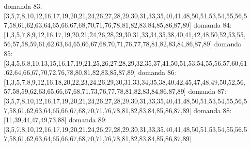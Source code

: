 domanda 83:[3,5,7,8,10,12,16,17,19,20,21,24,26,27,28,29,30,31,33,35,40,41,48,50,51,53,54,55,56,57,58,61,62,63,64,65,66,67,68,70,71,76,78,81,82,83,84,85,86,87,89]
domanda 84:[1,3,5,7,8,9,12,16,17,19,20,21,24,26,28,29,30,31,33,34,35,38,40,41,42,48,50,52,53,55,56,57,58,59,61,62,63,64,65,66,67,68,70,71,76,77,78,81,82,83,84,86,87,89]
domanda 85:[3,4,5,6,8,10,13,15,16,17,19,21,25,26,27,28,29,32,35,37,41,50,51,53,54,55,56,57,60,61,62,64,66,67,70,72,76,78,80,81,82,83,85,87,89]
domanda 86:[1,3,5,7,8,9,12,16,18,20,22,23,24,26,29,30,31,33,34,35,38,40,42,45,47,48,49,50,52,56,57,58,59,62,63,65,66,67,68,71,73,76,77,78,81,82,83,84,86,87,89]
domanda 87:[3,5,7,8,10,12,16,17,19,20,21,24,26,27,28,29,30,31,33,35,40,41,48,50,51,53,54,55,56,57,58,61,62,63,64,65,66,67,68,70,71,76,78,81,82,83,84,85,86,87,89]
domanda 88:[11,39,44,47,49,73,88]
domanda 89:[3,5,7,8,10,12,16,17,19,20,21,24,26,27,28,29,30,31,33,35,40,41,48,50,51,53,54,55,56,57,58,61,62,63,64,65,66,67,68,70,71,76,78,81,82,83,84,85,86,87,89]

